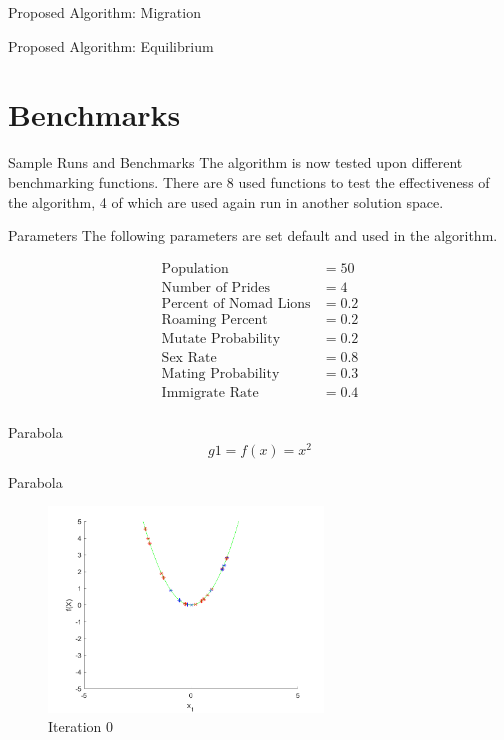 \documentclass[xcolor=table]{beamer}
\begin{document}
\begin{frame}{Proposed Algorithm: Migration}
\end{frame}

\begin{frame}{Proposed Algorithm: Equilibrium}
\end{frame}

\section{Benchmarks}

\begin{frame}{Sample Runs and Benchmarks}
The algorithm is now tested upon different benchmarking functions. There are 8 used functions to test the effectiveness of the algorithm, 4 of which are used again run in another solution space.
\end{frame}
\begin{frame}{Parameters}
The following parameters are set default and used in the algorithm.

\begin{align*}
\text{Population} &= 50\\
\text{Number of Prides} &= 4\\
\text{Percent of Nomad Lions} &= 0.2\\
\text{Roaming Percent} &= 0.2\\
\text{Mutate Probability} &= 0.2\\
\text{Sex Rate} &= 0.8\\
\text{Mating Probability} &= 0.3\\
\text{Immigrate Rate} &= 0.4\\
\end{align*}
\end{frame}
\begin{frame}{Parabola}
$$
  g1=f(x) = x^2
$$
\end{frame}
\begin{frame}{Parabola}
  \begin{figure}[h]
  \begin{center}
    \includegraphics[width=0.65\textwidth]{img/smpl/circ/loa-iter-0}
    \caption{Iteration 0}
  \end{center}
  \end{figure}
\end{frame}
\end{document}
